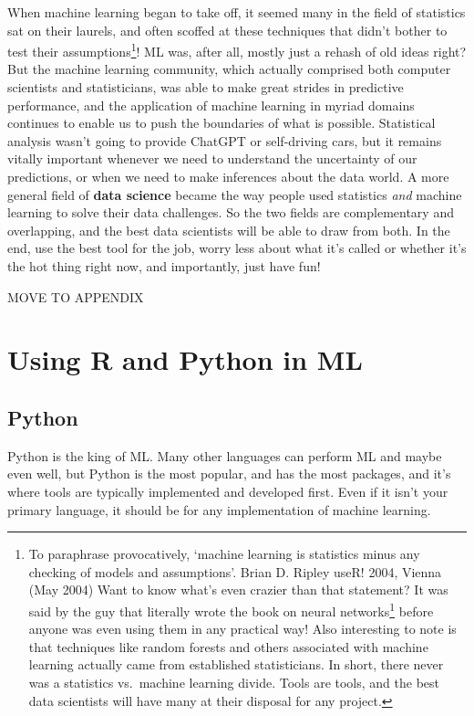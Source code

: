 \documentclass[
  letterpaper,
]{krantz}
\DeclareRobustCommand{\href}[2]{#2\footnote{\url{#1}}}
\begin{document}
When machine learning began to take off, it seemed many in the field of
statistics sat on their laurels, and often scoffed at these techniques
that didn't bother to test their assumptions\footnote{To paraphrase
  provocatively, `machine learning is statistics minus any checking of
  models and assumptions'. Brian D. Ripley useR! 2004, Vienna (May 2004)
  Want to know what's even crazier than that statement? It was said by
  the guy that literally
  \href{https://www.cambridge.org/core/books/pattern-recognition-and-neural-networks/4E038249C9BAA06C8F4EE6F044D09C5C}{wrote
  the book on neural networks} before anyone was even using them in any
  practical way! Also interesting to note is that techniques like random
  forests and others associated with machine learning actually came from
  established statisticians. In short, there never was a statistics
  vs.~machine learning divide. Tools are tools, and the best data
  scientists will have many at their disposal for any project.}! ML was,
after all, mostly just a rehash of old ideas right? But the machine
learning community, which actually comprised both computer scientists
and statisticians, was able to make great strides in predictive
performance, and the application of machine learning in myriad domains
continues to enable us to push the boundaries of what is possible.
Statistical analysis wasn't going to provide ChatGPT or self-driving
cars, but it remains vitally important whenever we need to understand
the uncertainty of our predictions, or when we need to make inferences
about the data world. A more general field of \textbf{data science}
became the way people used statistics \emph{and} machine learning to
solve their data challenges. So the two fields are complementary and
overlapping, and the best data scientists will be able to draw from
both. In the end, use the best tool for the job, worry less about what
it's called or whether it's the hot thing right now, and importantly,
just have fun!

MOVE TO APPENDIX

\section{Using R and Python in ML}\label{using-r-and-python-in-ml}

\subsection{Python}\label{python-79}

Python is the king of ML. Many other languages can perform ML and maybe
even well, but Python is the most popular, and has the most packages,
and it's where tools are typically implemented and developed first. Even
if it isn't your primary language, it should be for any implementation
of machine learning.
\end{document}
